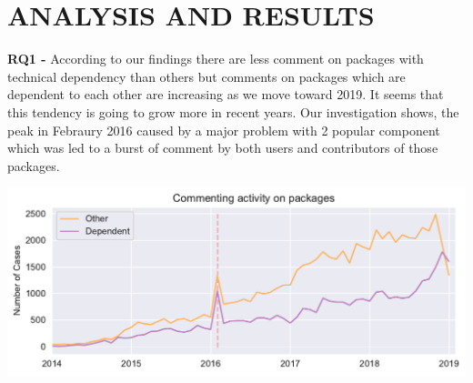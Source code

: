 \section{ANALYSIS AND RESULTS}

\textbf{RQ1 - }According to our findings there are less comment on packages with technical dependency than others but comments on packages which are dependent to each other are increasing as we move toward 2019. It seems that this tendency is going to grow more in recent years. Our investigation shows, the peak in Febraury 2016 caused by a major problem with 2 popular component which was led to a burst of comment by both users and contributors of those packages.

\includegraphics[width=\columnwidth]{Photos/RQ1_1.pdf} 